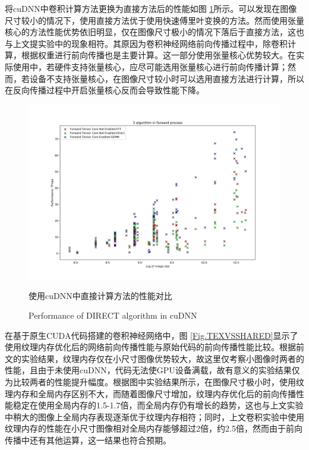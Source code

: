 \par 将cuDNN中卷积计算方法更换为直接方法后的性能如图 \ref{Fig.CNNDIRECT}所示。可以发现在图像尺寸较小的情况下，使用直接方法优于使用快速傅里叶变换的方法。然而使用张量核心的方法性能优势依旧明显，仅在图像尺寸极小的情况下落后于直接方法，这也与上文提实验中的现象相符。其原因为卷积神经网络前向传播过程中，除卷积计算，根据权重进行前向传播也是主要计算。这一部分使用张量核心优势较大。在实际使用中，若硬件支持张量核心，应尽可能选用张量核心进行前向传播计算；然而，若设备不支持张量核心，在图像尺寸较小时可以选用直接方法进行计算，所以在反向传播过程中开启张量核心反而会导致性能下降。
\begin{figure}
	\centering
	\includegraphics[width=15cm]{figures/CNN-HALF-3ALGOFWD.jpg}
	\renewcommand{\thefigure}{\arabic{section}-\arabic{figure} }
	\renewcommand{\figurename}{图}
	\caption{使用cuDNN中直接计算方法的性能对比}
	\addtocounter{figure}{-1}
	\renewcommand{\thefigure}{\arabic{section}-\arabic{figure} }
	\renewcommand{\figurename}{Figure}
	\caption{Performance of DIRECT algorithm in cuDNN}
	\label{Fig.CNNDIRECT}
\end{figure}
\par 在基于原生CUDA代码搭建的卷积神经网络中，图 \ref{Fig.TEXVSSHARED}显示了使用纹理内存优化后的网络前向传播性能与原始代码的前向传播性能比较。根据前文的实验结果，纹理内存仅在小尺寸图像优势较大，故这里仅考察小图像时两者的性能，且由于未使用cuDNN，代码无法使GPU设备满载，故有意义的实验结果仅为比较两者的性能提升幅度。根据图中实验结果所示，在图像尺寸极小时，使用纹理内存和全局内存区别不大，而随着图像尺寸增加，纹理内存优化后的前向传播性能稳定在使用全局内存的1.5-1.7倍，而全局内存仍有增长的趋势，这也与上文实验中稍大的图像上全局内存表现逐渐优于纹理内存相符；同时，上文卷积实验中使用纹理内存的性能在小尺寸图像相对全局内存能够超过2倍，约2.5倍，然而由于前向传播中还有其他运算，这一结果也符合预期。

